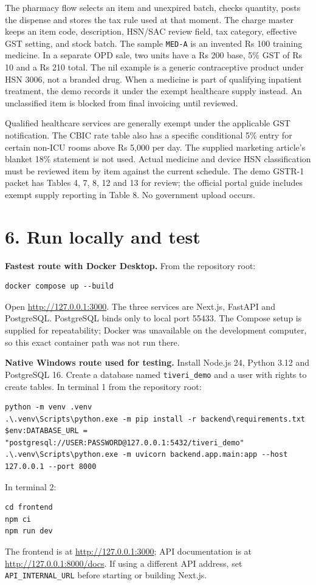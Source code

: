 \documentclass[11pt,a4paper]{article}
\newcommand{\sect}[1]{\section*{\color{navy}#1}\addcontentsline{toc}{section}{#1}}
\begin{document}
The pharmacy flow selects an item and unexpired batch, checks quantity, posts the dispense and stores the tax rule used at that moment. The charge master keeps an item code, description, HSN/SAC review field, tax category, effective GST setting, and stock batch. The sample \texttt{MED-A} is an invented Rs 100 training medicine. In a separate OPD sale, two units have a Rs 200 base, 5\% GST of Rs 10 and a Rs 210 total. The nil example is a generic contraceptive product under HSN 3006, not a branded drug. When a medicine is part of qualifying inpatient treatment, the demo records it under the exempt healthcare supply instead. An unclassified item is blocked from final invoicing until reviewed.

Qualified healthcare services are generally exempt under the applicable GST notification. The CBIC rate table also has a specific conditional 5\% entry for certain non-ICU rooms above Rs 5,000 per day. The supplied marketing article's blanket 18\% statement is not used. Actual medicine and device HSN classification must be reviewed item by item against the current schedule. The demo GSTR-1 packet has Tables 4, 7, 8, 12 and 13 for review; the official portal guide includes exempt supply reporting in Table 8. No government upload occurs.

\sect{6. Run locally and test}
\textbf{Fastest route with Docker Desktop.} From the repository root:
\begin{lstlisting}
docker compose up --build
\end{lstlisting}
Open \url{http://127.0.0.1:3000}. The three services are Next.js, FastAPI and PostgreSQL. PostgreSQL binds only to local port 55433. The Compose setup is supplied for repeatability; Docker was unavailable on the development computer, so this exact container path was not run there.

\textbf{Native Windows route used for testing.} Install Node.js 24, Python 3.12 and PostgreSQL 16. Create a database named \texttt{tiveri\_demo} and a user with rights to create tables. In terminal 1 from the repository root:
\begin{lstlisting}
python -m venv .venv
.\.venv\Scripts\python.exe -m pip install -r backend\requirements.txt
$env:DATABASE_URL = "postgresql://USER:PASSWORD@127.0.0.1:5432/tiveri_demo"
.\.venv\Scripts\python.exe -m uvicorn backend.app.main:app --host 127.0.0.1 --port 8000
\end{lstlisting}
In terminal 2:
\begin{lstlisting}
cd frontend
npm ci
npm run dev
\end{lstlisting}
The frontend is at \url{http://127.0.0.1:3000}; API documentation is at \url{http://127.0.0.1:8000/docs}. If using a different API address, set \texttt{API\_INTERNAL\_URL} before starting or building Next.js.
\end{document}
